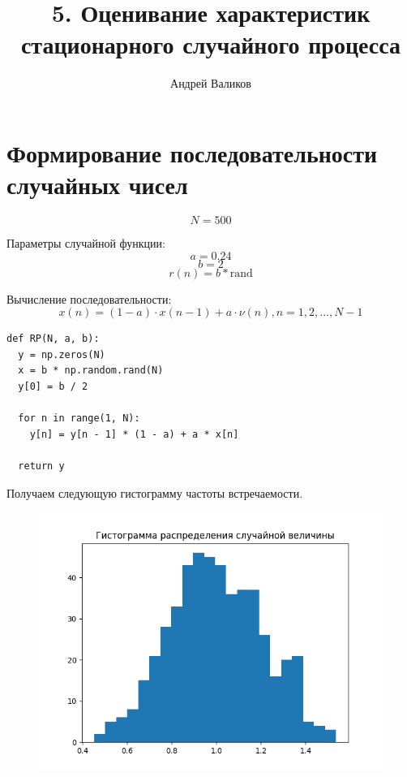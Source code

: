 \documentclass[12pt]{article}
\begin{document}
\title{5. Оценивание характеристик стационарного случайного процесса}
\author{Андрей Валиков}
\date{}
\maketitle
																																																								\section{Формирование последовательности случайных чисел}
																																																	
\[N = 500\]  
	
	  
Параметры случайной функции:
\[a = 0.24\]
\[b = 2\]
\[r(n)= b * \textrm{rand}\]	


Вычисление последовательности:
\[x(n) = ( 1 − a ) ⋅ x(n − 1) + a ⋅ \nu(n), n = 1, 2, ..., N −1\]



\begin{lstlisting}
def RP(N, a, b):
  y = np.zeros(N)
  x = b * np.random.rand(N)
  y[0] = b / 2

  for n in range(1, N):
    y[n] = y[n - 1] * (1 - a) + a * x[n]

  return y
\end{lstlisting}

Получаем следующую гистограмму частоты встречаемости.
\begin{figure}[!htb]
\centering
\includegraphics[scale=1.00]{hist.png}
\caption{}
\label{}
\end{figure}
\end{document}
